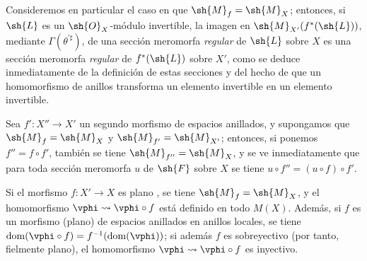 \begin{env}[20.1.11]
Consideremos en particular el caso en que $\sh{M}_f=\sh{M}_X$; entonces, si $\sh{L}$ es un $\sh{O}_X$-módulo invertible, la imagen en $\sh{M}_{X'}(f^*(\sh{L}))$, mediante $\Gamma(\theta^{\prime\sharp})$, de una sección meromorfa \emph{regular} de $\sh{L}$ sobre $X$  es una sección meromorfa \emph{regular} de $f^*(\sh{L})$ sobre $X'$, como se deduce inmediatamente de la definición de estas secciones y del hecho de que un homomorfismo de anillos transforma un elemento invertible en un elemento invertible.

Sea $f':X''\to X'$ un segundo morfismo de espacios anillados, y supongamos que $\sh{M}_f=\sh{M}_X$ y $\sh{M}_{f'}=\sh{M}_{X'}$; entonces, si ponemos $f''=f\circ f'$, también se tiene $\sh{M}_{f''}=\sh{M}_X$, y se ve inmediatamente que para toda sección meromorfa $u$ de $\sh{F}$ sobre $X$ se tiene $u\circ f''=(u\circ f)\circ f'$.
\end{env}

\begin{proposition}[20.1.12]
\label{IV.20.1.12}
Si el morfismo $f:X'\to X$ es plano , se tiene $\sh{M}_f=\sh{M}_X$, y el homomorfismo $\vphi\leadsto\vphi\circ f$ está definido en todo $M(X)$.
Además, si $f$ es un morfismo (plano) de espacios anillados en anillos locales, se tiene $\operatorname{dom}(\vphi\circ f)=f^{-1}(\operatorname{dom}(\vphi))$; si además $f$ es sobreyectivo (por tanto, fielmente plano), el homomorfismo $\vphi\leadsto\vphi\circ f$ es inyectivo.
\end{proposition}

